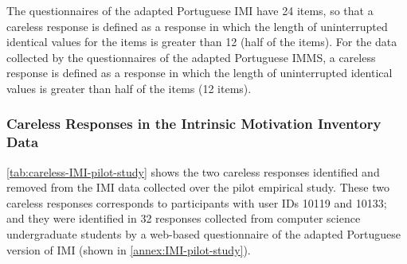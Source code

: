 The questionnaires of the adapted Portuguese IMI have 24 items, so that a careless response is defined as a response in which the length of uninterrupted identical values for the items is greater than 12 (half of the items). For the data collected by the questionnaires of the adapted Portuguese IMMS, a careless response is defined as a response in which the length of uninterrupted identical values is greater than half of the items (12 items).

\subsubsection*{Careless Responses in the Intrinsic Motivation Inventory Data}

\autoref{tab:careless-IMI-pilot-study} shows the two careless responses identified and removed from the IMI data collected over the pilot empirical study. These two careless responses corresponds to participants with user IDs 10119 and 10133; and they were identified in 32 responses collected from computer science undergraduate students by a web-based questionnaire of the adapted Portuguese version of IMI (shown in \autoref{annex:IMI-pilot-study}).


